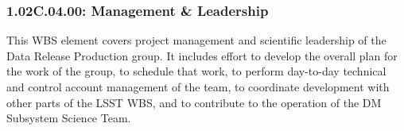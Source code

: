 \subsubsection*{1.02C.04.00: Management \& Leadership}

This WBS element covers project management and scientific leadership of the
Data Release Production group. It includes effort to develop the overall plan
for the work of the group, to schedule that work, to perform day-to-day
technical and control account management of the team, to coordinate
development with other parts of the LSST WBS, and to contribute to the
operation of the DM Subsystem Science Team.
